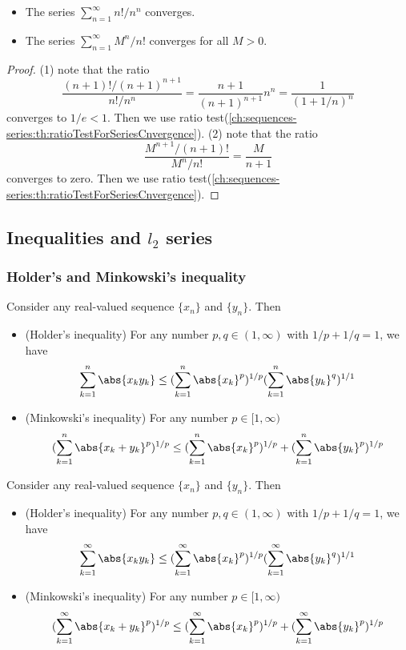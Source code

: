 \begin{refsection}
\begin{lemma}\label{ch:sequences-series:th:commonSeriesConvergence}\hfill
\begin{itemize}
	\item The series $\sum_{n=1}^\infty n!/n^n$ converges.
	\item The series $\sum_{n=1}^\infty M^n/n!$ converges for all $M > 0$.
\end{itemize}	
\end{lemma}
\begin{proof}
(1) note that the ratio
$$\frac{(n+1)!/(n+1)^{n+1}}{n!/n^n} = \frac{n+1}{(n+1)^{n+1}}n^n = \frac{1}{(1 + 1/n)^n}$$
converges to $1/e < 1$. Then we use ratio test(\autoref{ch:sequences-series:th:ratioTestForSeriesCnvergence}).
(2) note that the ratio
$$\frac{M^{n+1}/(n+1)!}{M^n/n!} = \frac{M}{n+1}$$ converges to zero.
Then we use ratio test(\autoref{ch:sequences-series:th:ratioTestForSeriesCnvergence}).
\end{proof}


\subsection{Inequalities and $l_2$ series}
\subsubsection{Holder's and Minkowski's inequality}
\begin{lemma}
Consider any real-valued sequence $\{x_n\}$ and $\{y_n\}$. Then
\begin{itemize}
	\item (Holder's inequality) For any number $p,q\in (1,\infty)$ with $1/p + 1/q = 1$, we have
	$$\sum_{k=1}^n\abs{x_ky_k} \leq (\sum_{k=1}^n\abs{x_k}^p)^{1/p}(\sum_{k=1}^n\abs{y_k}^q)^{1/1}  $$
	\item (Minkowski's inequality) For any number $p\in [1,\infty)$
	$$(\sum_{k=1}^n\abs{x_k + y_k}^p)^{1/p} \leq (\sum_{k=1}^n\abs{x_k}^p)^{1/p}+(\sum_{k=1}^n\abs{y_k}^p)^{1/p}$$
\end{itemize}	
\end{lemma}


\begin{theorem}
	Consider any real-valued sequence $\{x_n\}$ and $\{y_n\}$. Then
	\begin{itemize}
		\item (Holder's inequality) For any number $p,q\in (1,\infty)$ with $1/p + 1/q = 1$, we have
		$$\sum_{k=1}^\infty\abs{x_ky_k} \leq (\sum_{k=1}^\infty\abs{x_k}^p)^{1/p}(\sum_{k=1}^\infty\abs{y_k}^q)^{1/1}  $$
		\item (Minkowski's inequality) For any number $p\in [1,\infty)$
		$$(\sum_{k=1}^\infty\abs{x_k + y_k}^p)^{1/p} \leq (\sum_{k=1}^\infty\abs{x_k}^p)^{1/p}+(\sum_{k=1}^\infty\abs{y_k}^p)^{1/p}$$
	\end{itemize}	
\end{theorem}


\end{refsection}
